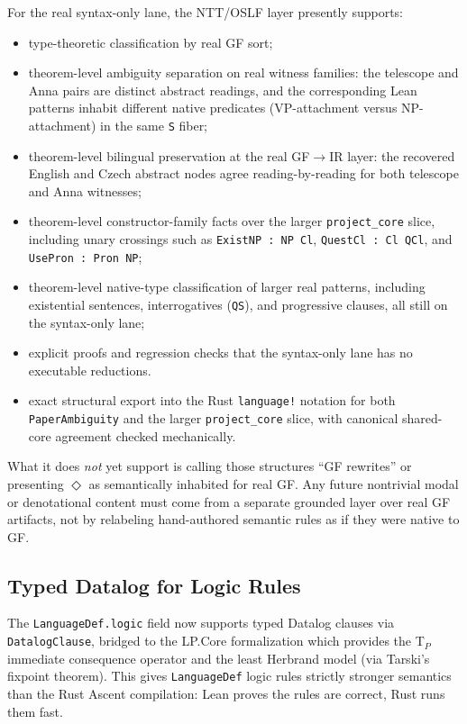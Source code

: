 \documentclass[]{article}
\newcommand{\code}[1]{\texttt{#1}}
\begin{document}
For the real syntax-only lane, the NTT/OSLF layer presently supports:
\begin{itemize}
\item type-theoretic classification by real GF sort;
\item theorem-level ambiguity separation on real witness families:
  the telescope and Anna pairs are distinct abstract readings, and the
  corresponding Lean patterns inhabit different native predicates
  (VP-attachment versus NP-attachment) in the same \code{S} fiber;
\item theorem-level bilingual preservation at the real GF$\to$IR layer:
  the recovered English and Czech abstract nodes agree reading-by-reading
  for both telescope and Anna witnesses;
\item theorem-level constructor-family facts over the larger
  \code{project\_core} slice, including unary crossings such as
  \code{ExistNP : NP \to Cl}, \code{QuestCl : Cl \to QCl}, and
  \code{UsePron : Pron \to NP};
\item theorem-level native-type classification of larger real patterns,
  including existential sentences, interrogatives (\code{QS}), and
  progressive clauses, all still on the syntax-only lane;
\item explicit proofs and regression checks that the syntax-only lane
  has no executable reductions.
\item exact structural export into the Rust \code{language!} notation for both
  \code{PaperAmbiguity} and the larger \code{project\_core} slice, with
  canonical shared-core agreement checked mechanically.
\end{itemize}

What it does \emph{not} yet support is calling those structures
``GF rewrites'' or presenting $\Diamond$ as semantically inhabited for
real GF.  Any future nontrivial modal or denotational content must come
from a separate grounded layer over real GF artifacts, not by
relabeling hand-authored semantic rules as if they were native to GF.

\subsection{Typed Datalog for Logic Rules}

The \code{LanguageDef.logic} field now supports typed Datalog clauses
via \code{DatalogClause}, bridged to the LP.Core formalization which
provides the T$_P$ immediate consequence operator and the least
Herbrand model (via Tarski's fixpoint theorem).  This gives
\code{LanguageDef} logic rules strictly stronger semantics than the
Rust Ascent compilation: Lean proves the rules are correct, Rust
runs them fast.
\end{document}
